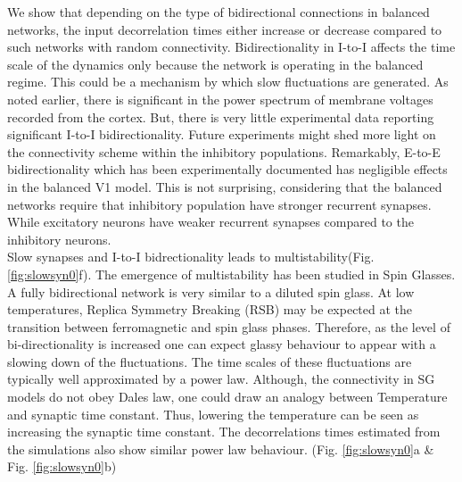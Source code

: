 We show that depending on the type of bidirectional connections in balanced networks, the input decorrelation times either increase or decrease compared to such networks with random connectivity. Bidirectionality in I-to-I affects the time scale of the dynamics only because the network is operating in the balanced regime. This could be a mechanism by which slow fluctuations are generated. As noted earlier, there is significant in the power spectrum of membrane voltages recorded from the cortex. But, there is very little experimental data reporting significant I-to-I bidirectionality. Future experiments might shed more light on the connectivity scheme within the inhibitory populations. Remarkably, E-to-E bidirectionality which has been experimentally documented has negligible effects in the balanced V1 model. This is not surprising, considering that the balanced networks require that inhibitory population have stronger recurrent synapses. While excitatory neurons have weaker recurrent synapses compared to the inhibitory neurons. \\
Slow synapses and I-to-I bidrectionality leads to multistability(Fig. \ref{fig:slowsyn0}f). The emergence of multistability has been studied in Spin Glasses. A fully bidirectional network is very similar to a diluted spin glass\cite{megard1987spin}. At low temperatures, Replica Symmetry Breaking (RSB) may be expected at the transition between ferromagnetic and spin glass phases. Therefore, as the level of bi-directionality is increased one can expect glassy behaviour to appear with a slowing down of the fluctuations\cite{Crisanti1987, Crisanti1988}. The time scales of these fluctuations are typically well approximated by a power law. Although, the connectivity in SG models do not obey Dales law, one could draw an analogy between Temperature and synaptic time constant. Thus, lowering the temperature can be seen as increasing the synaptic time constant. The decorrelations times estimated from the simulations also show similar power law behaviour. (Fig. \ref{fig:slowsyn0}a \& Fig. \ref{fig:slowsyn0}b) 






